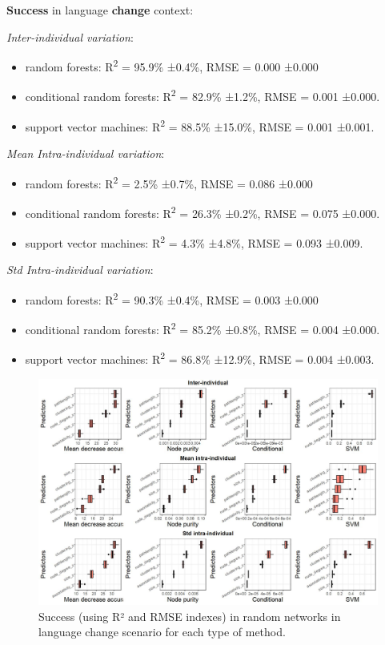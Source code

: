 \documentclass[
]{article}
\providecommand{\tightlist}{%
  \setlength{\itemsep}{0pt}\setlength{\parskip}{0pt}}
\begin{document}
\textbf{Success} in language \textbf{change} context:

\emph{Inter-individual variation}:

\begin{itemize}
\tightlist
\item
  random forests: R\textsuperscript{2} = 95.9\% ±0.4\%, RMSE = 0.000
  ±0.000
\item
  conditional random forests: R\textsuperscript{2} = 82.9\% ±1.2\%, RMSE
  = 0.001 ±0.000.
\item
  support vector machines: R\textsuperscript{2} = 88.5\% ±15.0\%, RMSE =
  0.001 ±0.001.
\end{itemize}

\emph{Mean Intra-individual variation}:

\begin{itemize}
\tightlist
\item
  random forests: R\textsuperscript{2} = 2.5\% ±0.7\%, RMSE = 0.086
  ±0.000
\item
  conditional random forests: R\textsuperscript{2} = 26.3\% ±0.2\%, RMSE
  = 0.075 ±0.000.
\item
  support vector machines: R\textsuperscript{2} = 4.3\% ±4.8\%, RMSE =
  0.093 ±0.009.
\end{itemize}

\emph{Std Intra-individual variation}:

\begin{itemize}
\tightlist
\item
  random forests: R\textsuperscript{2} = 90.3\% ±0.4\%, RMSE = 0.003
  ±0.000
\item
  conditional random forests: R\textsuperscript{2} = 85.2\% ±0.8\%, RMSE
  = 0.004 ±0.000.
\item
  support vector machines: R\textsuperscript{2} = 86.8\% ±12.9\%, RMSE =
  0.004 ±0.003.
\end{itemize}

\begin{figure}[!H]

{\centering \includegraphics{./Figures/unnamed-chunk-97-1} 

}

\caption{Success (using R² and RMSE indexes) in random networks in language change scenario for each type of method.}\label{fig:unnamed-chunk-97}
\end{figure}
\end{document}

